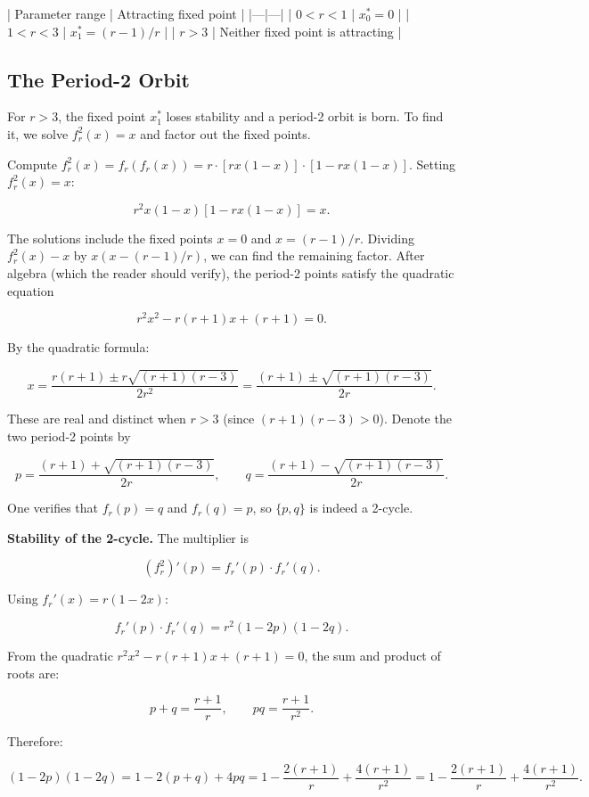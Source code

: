 | Parameter range | Attracting fixed point |
|---|---|
| $0 < r < 1$ | $x_0^* = 0$ |
| $1 < r < 3$ | $x_1^* = (r-1)/r$ |
| $r > 3$ | Neither fixed point is attracting |

\subsection{The Period-2 Orbit}\label{sec:2.4.3}

For $r > 3$, the fixed point $x_1^*$ loses stability and a period-2 orbit is born. To find it, we solve $f_r^2(x) = x$ and factor out the fixed points.

Compute $f_r^2(x) = f_r(f_r(x)) = r \cdot [rx(1-x)] \cdot [1 - rx(1-x)]$. Setting $f_r^2(x) = x$:

\[
r^2 x(1-x)[1 - rx(1-x)] = x.
\]

The solutions include the fixed points $x = 0$ and $x = (r-1)/r$. Dividing $f_r^2(x) - x$ by $x(x - (r-1)/r)$, we can find the remaining factor. After algebra (which the reader should verify), the period-2 points satisfy the quadratic equation

\[
r^2 x^2 - r(r+1)x + (r+1) = 0.
\]

By the quadratic formula:

\[
x = \frac{r(r+1) \pm r\sqrt{(r+1)(r-3)}}{2r^2} = \frac{(r+1) \pm \sqrt{(r+1)(r-3)}}{2r}.
\]

These are real and distinct when $r > 3$ (since $(r+1)(r-3) > 0$). Denote the two period-2 points by

\[
p = \frac{(r+1) + \sqrt{(r+1)(r-3)}}{2r}, \qquad q = \frac{(r+1) - \sqrt{(r+1)(r-3)}}{2r}.
\]

One verifies that $f_r(p) = q$ and $f_r(q) = p$, so $\{p, q\}$ is indeed a 2-cycle.

\textbf{Stability of the 2-cycle.} The multiplier is

\[
(f_r^2)'(p) = f_r'(p) \cdot f_r'(q).
\]

Using $f_r'(x) = r(1-2x)$:

\[
f_r'(p) \cdot f_r'(q) = r^2(1-2p)(1-2q).
\]

From the quadratic $r^2 x^2 - r(r+1)x + (r+1) = 0$, the sum and product of roots are:

\[
p + q = \frac{r+1}{r}, \qquad pq = \frac{r+1}{r^2}.
\]

Therefore:

\[
(1 - 2p)(1 - 2q) = 1 - 2(p+q) + 4pq = 1 - \frac{2(r+1)}{r} + \frac{4(r+1)}{r^2} = 1 - \frac{2(r+1)}{r} + \frac{4(r+1)}{r^2}.
\]

